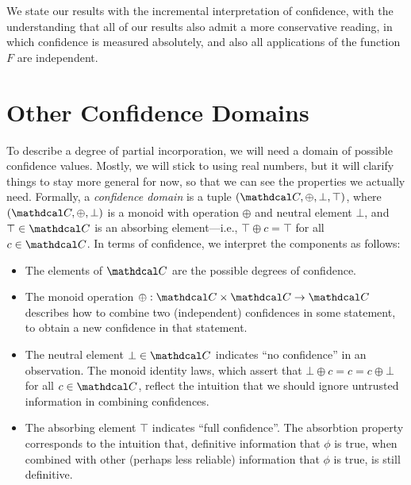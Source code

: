 We state our results with the incremental interpretation of confidence, with the understanding that all of our results also admit a more conservative reading, in which confidence is measured absolutely, and also all applications of the function $F$ are independent. 

\section{Other Confidence Domains}

To describe a degree of partial incorporation, we will need a domain of possible confidence values.
Mostly, we will stick to using real numbers, but it will clarify things to stay more general for now, so that we can see the properties we actually need.
Formally, a \emph{confidence domain} is a tuple $(\confdom, \oplus, \bot, \top)$,
where $(\confdom, \oplus, \bot)$ is a monoid with operation $\oplus$ and neutral element $\bot$, and $\top \in \confdom$ is an absorbing element---i.e., $\top \oplus c = \top$ for all $c \in \confdom$.
In terms of confidence, we interpret the components as follows:

\begin{itemize}%
	\item
	The elements of $\confdom$ are the possible degrees of confidence.

	\item
	The monoid operation $\oplus : \confdom \times \confdom \to \confdom$ describes how to combine two (independent) confidences in some statement, to obtain a new confidence in that statement.

	\item The neutral element $\bot \in \confdom$ indicates ``no confidence'' in an observation.
	The monoid identity laws, which assert that
		$\bot \oplus c = c = c \oplus \bot$ for all $c \in \confdom$,
	reflect the intuition that we should ignore untrusted information in combining confidences.
	\item The absorbing element $\top$ indicates ``full confidence''.
	The absorbtion property corresponds to the intuition that, definitive information that $\phi$ is true, when combined with other (perhaps less reliable) information that $\phi$ is true, is still definitive.
\end{itemize}

